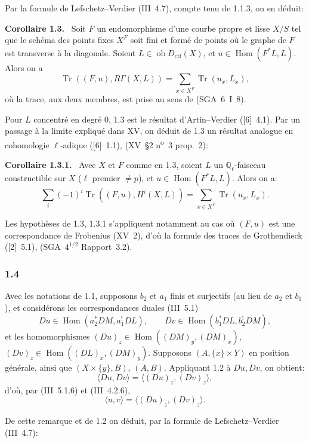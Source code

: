 \documentclass[11pt]{article}
\newenvironment{statement}[1]{\par\medskip\noindent\textbf{#1.}\ }{\par\medskip}
\DeclareMathOperator{\Hom}{Hom}
\newcommand{\ob}{\operatorname{ob}}
\providecommand{\ctf}{\mathrm{ctf}}
\providecommand{\Tr}{\operatorname{Tr}}
\providecommand{\Tr}{\operatorname{Tr}}
\providecommand{\Tr}{\operatorname{Tr}}
\providecommand{\Hom}{\operatorname{Hom}}
\providecommand{\ob}{\operatorname{ob}}
\begin{document}
Par la formule de Lefschetz--Verdier (III~4.7), compte tenu de 1.1.3, on en déduit:

\begin{statement}{Corollaire 1.3}
Soit $F$ un endomorphisme d'une courbe propre et lisse $X/S$ tel que le schéma des points fixes $X^F$ soit fini et formé de points où le graphe de $F$ est transverse à la diagonale. Soient $L\in\ob D_{\ctf}(X)$, et $u\in\Hom(F^*L,L)$. Alors on a
\[
\Tr((F,u),R\Gamma(X,L))=\sum_{x\in X^F}\Tr(u_x,L_x),
\]
où la trace, aux deux membres, est prise au sens de (SGA~6~I~8).
\end{statement}

Pour $L$ concentré en degré $0$, 1.3 est le résultat d'Artin--Verdier ([6]~4.1). Par un passage à la limite expliqué dans XV, on déduit de 1.3 un résultat analogue en cohomologie $\ell$-adique ([6]~1.1), (XV~\S2 n\textsuperscript{o}~3 prop.~2):

\begin{statement}{Corollaire 1.3.1}
Avec $X$ et $F$ comme en 1.3, soient $L$ un $\mathbb Q_\ell$-faisceau constructible sur $X$ ($\ell$ premier $\ne p$), et $u\in\Hom(F^*L,L)$. Alors on a:
\[
\sum_i(-1)^i\Tr((F,u),H^i(X,L))=\sum_{x\in X^F}\Tr(u_x,L_x).
\]
\end{statement}

Les hypothèses de 1.3, 1.3.1 s'appliquent notamment au cas où $(F,u)$ est une correspondance de Frobenius (XV~2), d'où la formule des traces de Grothendieck ([2]~5.1), (SGA~$4^{1/2}$ Rapport~3.2).

\subsubsection*{1.4}
Avec les notations de 1.1, supposons $b_2$ et $a_1$ finis et surjectifs (au lieu de $a_2$ et $b_1$), et considérons les correspondances duales (III~5.1)
\[
Du\in\Hom(a_2^*DM,a_1^!DL),\qquad Dv\in\Hom(b_1^*DL,b_2^!DM),
\]
et les homomorphismes $(Du)_z\in\Hom((DM)_y,(DM)_x)$, $(Dv)_z\in\Hom((DL)_x,(DM)_y)$. Supposons $(A,\{x\}\times Y)$ en position générale, ainsi que $(X\times\{y\},B)$, $(A,B)$. Appliquant 1.2 à $Du,Dv$, on obtient:
\[
\langle Du,Dv\rangle=\langle (Du)_z,(Dv)_z\rangle,
\]
d'où, par (III~5.1.6) et (III~4.2.6),
\begin{equation}\tag{1.4.1}
\langle u,v\rangle=\langle (Du)_z,(Dv)_z\rangle.
\end{equation}

De cette remarque et de 1.2 on déduit, par la formule de Lefschetz--Verdier (III~4.7):
\end{document}
